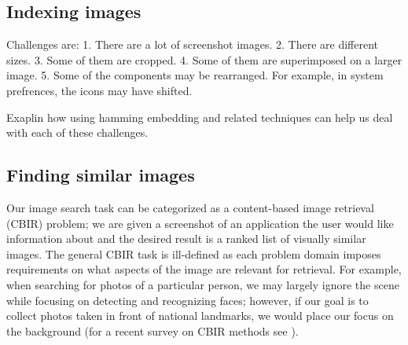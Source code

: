 \documentclass{www2010-submission}
\begin{document}
%




\subsection{Indexing images}
Challenges are:
1. There are a lot of screenshot images.
2. There are different sizes.
3. Some of them are cropped.
4. Some of them are superimposed on a larger image.
5. Some of the components may be rearranged. For example,
in system prefrences, the icons may have shifted.

Exaplin how using hamming embedding and related techniques can
help us deal with each of these challenges.

\subsection{Finding similar images}
Our image search task can be categorized as a content-based image
retrieval (CBIR) problem; we are given a screenshot of an application
the user would like information about and the desired result is a
ranked list of visually similar images.  The general CBIR task is
ill-defined as each problem domain imposes requirements on what
aspects of the image are relevant for retrieval.  For example, when
searching for photos of a particular person, we may largely ignore the
scene while focusing on detecting and recognizing faces; however, if
our goal is to collect photos taken in front of national landmarks, we
would place our focus on the background (for a recent survey on CBIR
methods see \cite{Datta1348248}).
\end{document}
